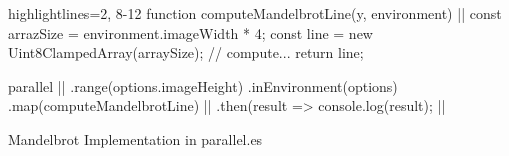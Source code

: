\begin{listing}
	\begin{javascriptcode*}{highlightlines={2, 8-12}}
function computeMandelbrotLine(y, environment) { |$\label{code:parallel-es-operation}$|
	const arrazSize = environment.imageWidth * 4;
	const line = new Uint8ClampedArray(arraySize);
	// compute...
	return line;
}

parallel      |$\label{code:parallel-es-definition-start}$|
	.range(options.imageHeight)
	.inEnvironment(options)
	.map(computeMandelbrotLine) |$\label{code:parallel-es-map}$|
	.then(result => console.log(result); |$\label{code:parallel-es-start}$|
	\end{javascriptcode*}
	
	\caption{Mandelbrot Implementation in parallel.es}
	\label{code:mandelbrot-parallel.es}
\end{listing}


